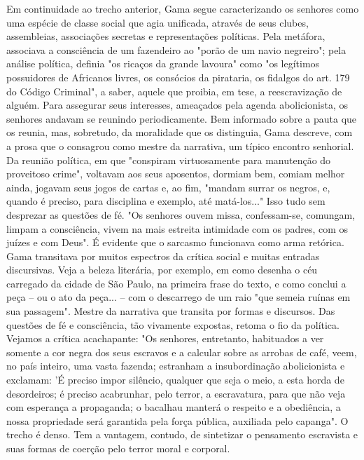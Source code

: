 {\small\noindent
Em continuidade ao trecho anterior, Gama segue caracterizando os
senhores como uma espécie de classe social que agia unificada, através
de seus clubes, assembleias, associações secretas e representações
políticas. Pela metáfora, associava a consciência de um fazendeiro ao
"porão de um navio negreiro"; pela análise política, definia "os ricaços
da grande lavoura" como "os legítimos possuidores de Africanos livres,
os consócios da pirataria, os fidalgos do art. 179 do Código Criminal",
a saber, aquele que proibia, em tese, a reescravização de alguém. Para
assegurar seus interesses, ameaçados pela agenda abolicionista, os
senhores andavam se reunindo periodicamente. Bem informado sobre a pauta
que os reunia, mas, sobretudo, da moralidade que os distinguia, Gama
descreve, com a prosa que o consagrou como mestre da narrativa, um
típico encontro senhorial. Da reunião política, em que "conspiram
virtuosamente para manutenção do proveitoso crime", voltavam aos seus
aposentos, dormiam bem, comiam melhor ainda, jogavam seus jogos de
cartas e, ao fim, "mandam surrar os negros, e, quando é preciso, para
disciplina e exemplo, até matá-los..." Isso tudo sem desprezar as
questões de fé. "Os senhores ouvem missa, confessam-se, comungam, limpam
a consciência, vivem na mais estreita intimidade com os padres, com os
juízes e com Deus". É evidente que o sarcasmo funcionava como arma
retórica. Gama transitava por muitos espectros da crítica social e
muitas entradas discursivas. Veja a beleza literária, por exemplo, em
como desenha o céu carregado da cidade de São Paulo, na primeira frase
do texto, e como conclui a peça -- ou o ato da peça... -- com o
descarrego de um raio "que semeia ruínas em sua passagem". Mestre da
narrativa que transita por formas e discursos. Das questões de fé e
consciência, tão vivamente expostas, retoma o fio da política. Vejamos a
crítica acachapante: "Os senhores, entretanto, habituados a ver somente
a cor negra dos seus escravos e a calcular sobre as arrobas de café,
veem, no país inteiro, uma vasta fazenda; estranham a insubordinação
abolicionista e exclamam: 'É preciso impor silêncio, qualquer que seja o
meio, a esta horda de desordeiros; é preciso acabrunhar, pelo terror, a
escravatura, para que não veja com esperança a propaganda; o bacalhau
manterá o respeito e a obediência, a nossa propriedade será garantida
pela força pública, auxiliada pelo capanga". O trecho é denso. Tem a
vantagem, contudo, de sintetizar o pensamento escravista e suas formas
de coerção pelo terror moral e corporal. }

